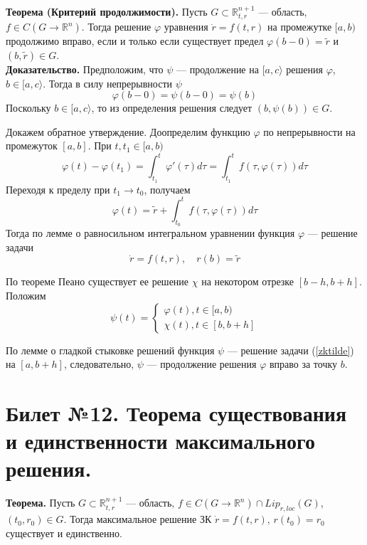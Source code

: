 \documentclass{article}
\begin{document}
\noindent \textbf{Теорема (Критерий продолжимости).} Пусть $G \subset \mathbb{R}_{t,r}^{n+1}$ --- область, $f \in C(G \to \mathbb{R}^{n})$. Тогда решение $\varphi$ уравнения $\dot{r} = f(t,r)$ на промежутке $[a,b)$ продолжимо вправо, если и только если существует предел $\varphi(b - 0) = \widetilde{r}$ и $(b, \widetilde{r}) \in G$.\\

\noindent \textbf{Доказательство.} Предположим, что $\psi$ --- продолжение на $[a,c\rangle$ решения $\varphi$, $b \in [a,c\rangle$. Тогда в силу непрерывности $\psi$
\begin{equation*}
    \varphi(b-0) = \psi(b-0) = \psi(b)
\end{equation*}
Поскольку $b \in [a,c\rangle$, то из определения решения следует $(b, \psi(b)) \in G$.

Докажем обратное утверждение. Доопределим функцию $\varphi$ по непрерывности на промежуток $[a,b]$. При $t,t_1 \in [a,b)$
\begin{equation*}
    \varphi(t) - \varphi(t_1) = \int_{t_1}^t \varphi'(\tau)d\tau = \int_{t_1}^t f(\tau, \varphi(\tau))d\tau
\end{equation*}
Переходя к пределу при $t_1 \to t_0$, получаем
\begin{equation*}
    \varphi(t) = \widetilde{r} + \int_{t_0}^t f(\tau, \varphi(\tau))d\tau
\end{equation*}
Тогда по лемме о равносильном интегральном уравнении функция $\varphi$ --- решение задачи
\begin{equation}
    \dot{r} = f(t,r), \quad r(b) = \widetilde{r} \label{zktilde}
\end{equation}

По теореме Пеано существует ее решение $\chi$ на некотором отрезке $[b-h, b+h]$. Положим
\begin{equation*}
    \psi(t) = \begin{cases}
    \varphi(t), t \in [a,b)\\
    \chi(t), t \in [b, b + h]
    \end{cases}
\end{equation*}

По лемме о гладкой стыковке решений функция $\psi$ --- решение задачи (\ref{zktilde}) на $[a,b+h]$, следовательно, $\psi$ --- продолжение решения $\varphi$ вправо за точку $b$.

\section{Билет №12. Теорема существования и единственности максимального решения.}
\textbf{Теорема.} Пусть $G \subset \mathbb{R}_{t,r}^{n+1}$ --- область, $f \in C(G \to \mathbb{R}^{n}) \cap Lip_{r,loc}(G)$, $(t_0, r_0) \in G$. Тогда максимальное решение ЗК $\dot{r} = f(t,r),\, r(t_0) = r_0$ существует и единственно.\\
\end{document}
